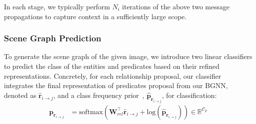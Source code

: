 In each stage, we typically perform $N_i$ iterations of the above two message propagations to capture context in a sufficiently large scope.

    
%


\subsubsection{Scene Graph Prediction} 
\label{subsec:predictor}

To generate the scene graph of the given image, we introduce two linear classifiers to predict the class of the entities and predicates based on their refined representations. Concretely, for each relationship proposal, our classifier integrates the final representation of predicates proposal from our BGNN, denoted as $\hat{\mathbf{r}}_{i\to j}$, and a class frequency prior~\cite{zellers_neural_2017}, $\hat{\mathbf{p}}_{\mathbf{r}_{i\rightarrow j}}$, for classification:
\begin{align}
    \mathbf{p}_{\mathbf{r}_{i\rightarrow j}} &= \text{softmax}\left(\mathbf{W}_{rel}^\intercal \hat{\mathbf{r}}_{i\rightarrow j} + \text{log}(\hat{\mathbf{p}}_{\mathbf{r}_{i\rightarrow j}}) \right)\in\mathbb{R}^{\mathcal{C}_p}
\end{align}

